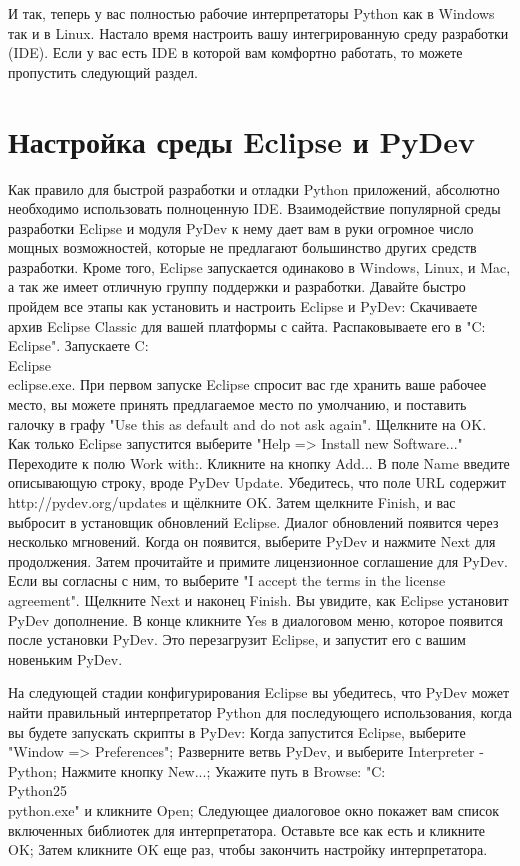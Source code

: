 \documentclass[12pt]{book}
\begin{document}
И так, теперь у вас полностью рабочие интерпретаторы Python как в Windows так и в Linux. Настало время настроить вашу интегрированную среду разработки (IDE). Если у вас есть IDE в которой вам комфортно работать, то можете пропустить следующий раздел.


\section{Настройка среды Eclipse и PyDev}

Как правило для быстрой разработки и отладки Python приложений, абсолютно необходимо использовать полноценную IDE. Взаимодействие популярной среды разработки Eclipse и модуля PyDev к нему дает вам в руки огромное число мощных возможностей, которые не предлагают большинство других средств разработки. Кроме того, Eclipse запускается одинаково в Windows, Linux, и Mac, а так же имеет отличную группу поддержки и разработки. Давайте быстро пройдем все этапы как установить и настроить Eclipse и PyDev:
Скачиваете архив Eclipse Classic для вашей платформы с сайта.
Распаковываете его в "C:\\Eclipse".
Запускаете C:\\Eclipse\\eclipse.exe.
При первом запуске Eclipse спросит вас где хранить ваше рабочее место, вы можете принять предлагаемое место по умолчанию, и поставить галочку в графу "Use this as default and do not ask again". Щелкните на OK.
Как только Eclipse запустится выберите "Help => Install new Software..."
Переходите к полю Work with:.
Кликните на кнопку Add...
В поле Name введите описывающую строку, вроде PyDev Update. Убедитесь, что поле URL содержит http://pydev.org/updates и щёлкните OK. Затем щелкните Finish, и вас выбросит в установщик обновлений Eclipse.
Диалог обновлений появится через несколько мгновений. Когда он появится, выберите PyDev и нажмите Next для продолжения.
Затем прочитайте и примите лицензионное соглашение для PyDev. Если вы согласны с ним, то выберите "I accept the terms in the license agreement".
Щелкните Next и наконец Finish. Вы увидите, как Eclipse установит PyDev дополнение.
В конце кликните Yes в диалоговом меню, которое появится после установки PyDev. Это перезагрузит Eclipse, и запустит его с вашим новеньким PyDev.

На следующей стадии конфигурирования Eclipse вы убедитесь, что PyDev может найти правильный интерпретатор Python для последующего использования, когда вы будете запускать скрипты в PyDev:
Когда запустится Eclipse, выберите "Window => Preferences";
Разверните ветвь PyDev, и выберите Interpreter - Python;
Нажмите кнопку New...;
Укажите путь в Browse: "C:\\Python25\\python.exe" и кликните Open;
Следующее диалоговое окно покажет вам список включенных библиотек для интерпретатора. Оставьте все как есть и кликните OK;
Затем кликните OK еще раз, чтобы закончить настройку интерпретатора.
\end{document}
